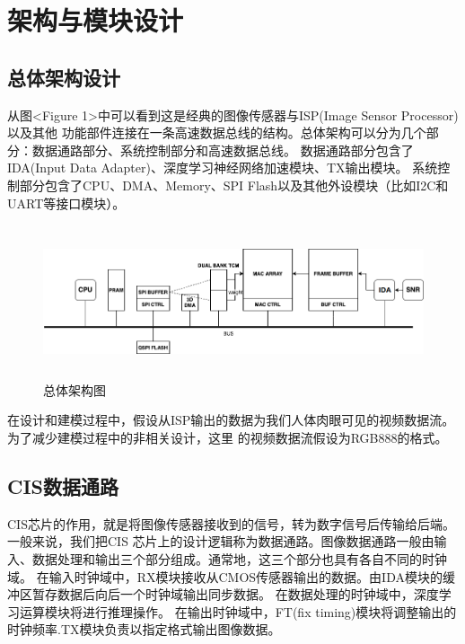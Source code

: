 
\chapter{架构与模块设计}

\section{总体架构设计}

从图<Figure 1>中可以看到这是经典的图像传感器与ISP(Image Sensor Processor)以及其他
功能部件连接在一条高速数据总线的结构。总体架构可以分为几个部分：数据通路部分、系统控制部分和高速数据总线。
数据通路部分包含了IDA(Input Data Adapter)、深度学习神经网络加速模块、TX输出模块。
系统控制部分包含了CPU、DMA、Memory、SPI Flash以及其他外设模块（比如I2C和UART等接口模块）。
\begin{figure}[htbp]
    \centering
    \includegraphics[width=15cm,height=4.5cm]{figures/bnn.png}
    \caption{总体架构图}
    \label{1}
\end{figure}
在设计和建模过程中，假设从ISP输出的数据为我们人体肉眼可见的视频数据流。为了减少建模过程中的非相关设计，这里
的视频数据流假设为RGB888的格式。

\section{CIS数据通路}
CIS芯片的作用，就是将图像传感器接收到的信号，转为数字信号后传输给后端。一般来说，我们把CIS
芯片上的设计逻辑称为数据通路。图像数据通路一般由输入、数据处理和输出三个部分组成。通常地，这三个部分也具有各自不同的时钟域。
在输入时钟域中，RX模块接收从CMOS传感器输出的数据。由IDA模块的缓冲区暂存数据后向后一个时钟域输出同步数据。
在数据处理的时钟域中，深度学习运算模块将进行推理操作。
在输出时钟域中，FT(fix timing)模块将调整输出的时钟频率.TX模块负责以指定格式输出图像数据。  

